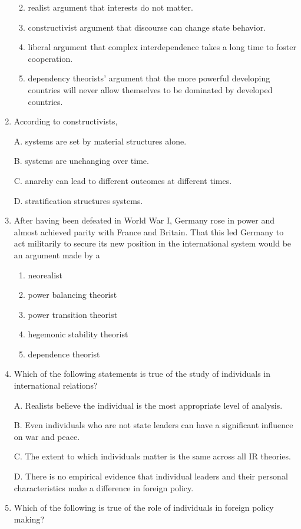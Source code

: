 \documentclass[
]{book}
\begin{document}
\begin{enumerate}
  \begin{enumerate}
  \def\labelenumii{\Alph{enumii}.}
  \item
    realist argument that interests do not matter.
  \item
    constructivist argument that discourse can change state behavior.
  \item
    liberal argument that complex interdependence takes a long time to foster cooperation.
  \item
    dependency theorists' argument that the more powerful developing countries will never allow themselves to be dominated by developed countries.
  \end{enumerate}
\item
  According to constructivists,

  A. systems are set by material structures alone.

  B. systems are unchanging over time.

  C. anarchy can lead to different outcomes at different times.

  D. stratification structures systems.
\item
  After having been defeated in World War I, Germany rose in power and almost achieved parity with France and Britain. That this led Germany to act militarily to secure its new position in the international system would be an argument made by a

  \begin{enumerate}
  \def\labelenumii{\Alph{enumii}.}
  \item
    neorealist
  \item
    power balancing theorist
  \item
    power transition theorist
  \item
    hegemonic stability theorist
  \item
    dependence theorist
  \end{enumerate}
\item
  Which of the following statements is true of the study of individuals in international relations?

  A. Realists believe the individual is the most appropriate level of analysis.

  B. Even individuals who are not state leaders can have a significant influence on war and peace.

  C. The extent to which individuals matter is the same across all IR theories.

  D. There is no empirical evidence that individual leaders and their personal characteristics make a difference in foreign policy.
\item
  Which of the following is true of the role of individuals in foreign policy making?


\end{enumerate}
\end{document}
